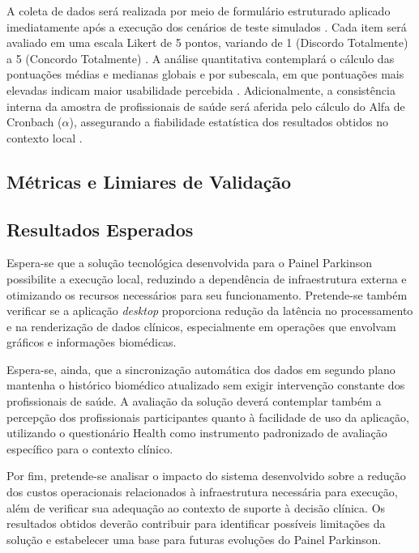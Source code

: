 A coleta de dados será realizada por meio de formulário estruturado aplicado imediatamente após a execução dos cenários de teste simulados \cite{Tejeda2024}. Cada item será avaliado em uma escala Likert de 5 pontos, variando de 1 (Discordo Totalmente) a 5 (Concordo Totalmente) \cite{Tejeda2024, Gerchow2026}. A análise quantitativa contemplará o cálculo das pontuações médias e medianas globais e por subescala, em que pontuações mais elevadas indicam maior usabilidade percebida \cite{Tejeda2024}. Adicionalmente, a consistência interna da amostra de profissionais de saúde será aferida pelo cálculo do Alfa de Cronbach ($\alpha$), assegurando a fiabilidade estatística dos resultados obtidos no contexto local \cite{Gerchow2026}.

\subsection{Métricas e Limiares de Validação}

\subsection{Resultados Esperados}

Espera-se que a solução tecnológica desenvolvida para o Painel Parkinson possibilite a execução local, reduzindo a dependência de infraestrutura externa e otimizando os recursos necessários para seu funcionamento. Pretende-se também verificar se a aplicação \textit{desktop} proporciona redução da latência no processamento e na renderização de dados clínicos, especialmente em operações que envolvam gráficos e informações biomédicas.

Espera-se, ainda, que a sincronização automática dos dados em segundo plano mantenha o histórico biomédico atualizado sem exigir intervenção constante dos profissionais de saúde. A avaliação da solução deverá contemplar também a percepção dos profissionais participantes quanto à facilidade de uso da aplicação, utilizando o questionário Health como instrumento padronizado de avaliação específico para o contexto clínico.

Por fim, pretende-se analisar o impacto do sistema desenvolvido sobre a redução dos custos operacionais relacionados à infraestrutura necessária para execução, além de verificar sua adequação ao contexto de suporte à decisão clínica. Os resultados obtidos deverão contribuir para identificar possíveis limitações da solução e estabelecer uma base para futuras evoluções do Painel Parkinson.